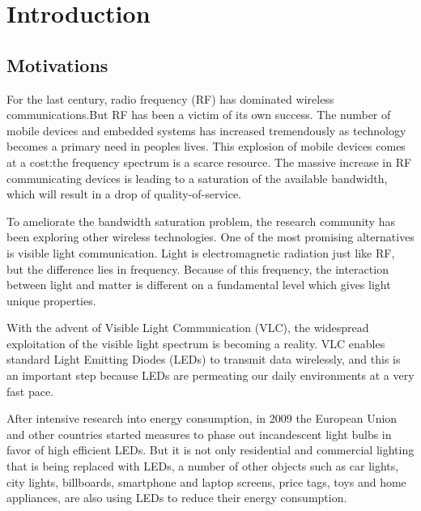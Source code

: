 
\chapter{Introduction} %

\label{Chapter1} %

	

\section{Motivations}

For the last century, radio frequency (RF) has dominated wireless communications.But RF has been a victim of its own success. The number of mobile devices and embedded systems has increased tremendously as technology becomes a primary need in peoples lives. This explosion of mobile devices comes at a cost:the frequency spectrum is a scarce resource. The massive increase in RF communicating devices is leading to a saturation of the available bandwidth, which will  result in a drop of quality-of-service.

To ameliorate the bandwidth saturation problem, the research community has been exploring other wireless technologies. One of the most promising alternatives is visible light communication. Light is electromagnetic radiation just like RF, but the difference lies in frequency. Because of this frequency, the interaction between light and matter is different on a fundamental level which gives light unique properties.

With the advent of Visible Light Communication (VLC), the widespread exploitation of the visible light spectrum is becoming a reality. VLC enables standard
Light Emitting Diodes (LEDs) to transmit data wirelessly, and this is an important step because LEDs are permeating our daily environments at a very fast pace.

After intensive research into energy consumption, in 2009 the European Union and other countries started measures to phase out incandescent light bulbs in
favor of high efficient LEDs. But it is not only residential and commercial lighting that is being replaced with LEDs, a number of other objects such as car lights,
city lights, billboards, smartphone and laptop screens, price tags, toys and home appliances, are also using LEDs to reduce their energy consumption.

